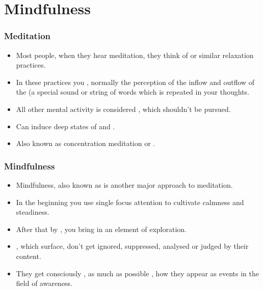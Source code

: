 \section{Mindfulness}
\begin{frame}
\frametitle{Meditation}
\begin{itemize}
\item Most people, when they hear meditation, they think of  or similar relaxation practices.
\item In these practices you  , normally the perception of the inflow and outflow of the  (a special sound or string of words which is repeated in your thoughts.
\item All other mental activity is considered , which shouldn't be pursued.
\item Can induce deep states of  and .
\item Also known as concentration meditation or .   
\end{itemize}
\end{frame}
\begin{frame}
\frametitle{Mindfulness}
\begin{itemize}
\item Mindfulness, also known as  is another major approach to meditation.
\item In the beginning you use single focus attention to cultivate calmness and steadiness.
\item After that by , you bring in an element of exploration.
\item {}, which surface, don't get ignored, suppressed, analysed or judged by their content.
\item They get consciously , as much as possible , how they appear as events in the field of awareness.
\end{itemize}
\end{frame}
